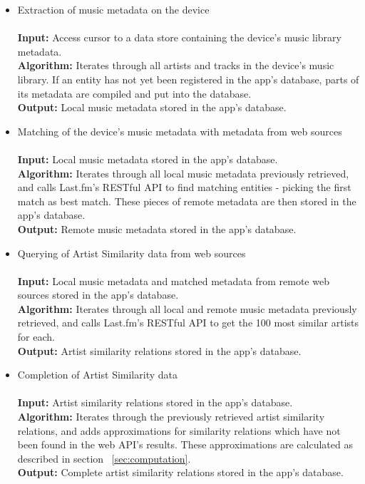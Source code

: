 \begin{itemize}
	\item Extraction of music metadata on the device \\\\
			\textbf{Input:} Access cursor to a data store containing the device's music library metadata.  \\
			\textbf{Algorithm:} Iterates through all artists and tracks in the device's music library.
			If an entity has not yet been registered in the app's database, parts of its metadata are 
			compiled and put into the database. \\
			\textbf{Output:} Local music metadata stored in the app's database.\\
			
	\item Matching of the device's music metadata with metadata from web sources \\\\
			\textbf{Input:} Local music metadata stored in the app's database.  \\
			\textbf{Algorithm:} Iterates through all local music metadata previously retrieved, and calls
			Last.fm's RESTful API to find matching entities - picking the first match as best match. These pieces
			of remote metadata are then stored in the app's database. \\
			\textbf{Output:} Remote music metadata stored in the app's database. \\
			
	\item Querying of Artist Similarity data from web sources \\\\
			\textbf{Input:} Local music metadata and matched metadata from remote web sources stored in the app's database. \\
			\textbf{Algorithm:} Iterates through all local and remote music metadata previously retrieved, and calls
			Last.fm's RESTful API to get the 100 most similar artists for each. \\
			\textbf{Output:} Artist similarity relations stored in the app's database. \\
			
	\item Completion of Artist Similarity data \\\\
			\textbf{Input:} Artist similarity relations stored in the app's database. \\
			\textbf{Algorithm:} Iterates through the previously retrieved artist similarity relations, and
			adds approximations for similarity relations which have not been found in the web API's results.
			These approximations are calculated as described in section ~\ref{sec:computation}. \\
			\textbf{Output:} Complete artist similarity relations stored in the app's database. \\
			

\end{itemize}
